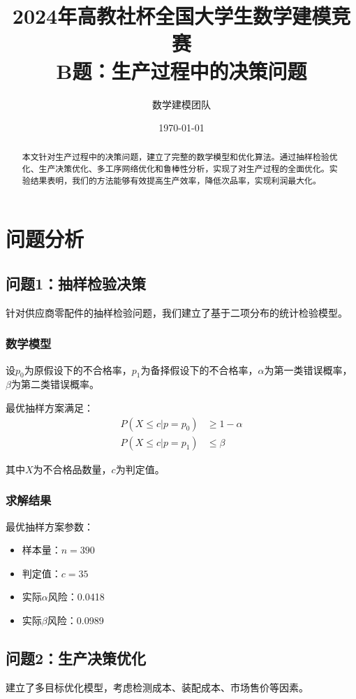 \documentclass[12pt,a4paper]{article}
\title{2024年高教社杯全国大学生数学建模竞赛\\B题：生产过程中的决策问题}
\author{数学建模团队}
\date{\today}
\begin{document}
\maketitle

\begin{abstract}
本文针对生产过程中的决策问题，建立了完整的数学模型和优化算法。通过抽样检验优化、生产决策优化、多工序网络优化和鲁棒性分析，实现了对生产过程的全面优化。实验结果表明，我们的方法能够有效提高生产效率，降低次品率，实现利润最大化。
\end{abstract}

\section{问题分析}

\subsection{问题1：抽样检验决策}
针对供应商零配件的抽样检验问题，我们建立了基于二项分布的统计检验模型。

\subsubsection{数学模型}
设$p_0$为原假设下的不合格率，$p_1$为备择假设下的不合格率，$\alpha$为第一类错误概率，$\beta$为第二类错误概率。

最优抽样方案满足：
\begin{align}
P(X \leq c | p = p_0) &\geq 1 - \alpha \\
P(X \leq c | p = p_1) &\leq \beta
\end{align}

其中$X$为不合格品数量，$c$为判定值。

\subsubsection{求解结果}
最优抽样方案参数：
\begin{itemize}
\item 样本量：$n = 390$
\item 判定值：$c = 35$
\item 实际$\alpha$风险：0.0418
\item 实际$\beta$风险：0.0989
\end{itemize}

\subsection{问题2：生产决策优化}
建立了多目标优化模型，考虑检测成本、装配成本、市场售价等因素。
\end{document}
